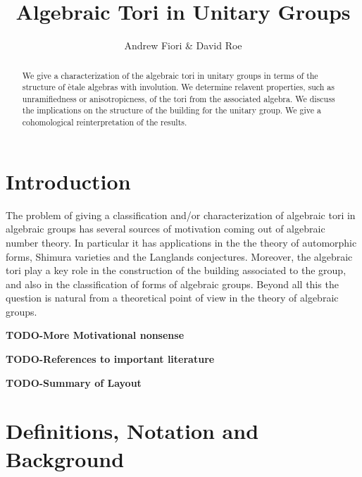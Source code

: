 \documentclass{article}
\title{Algebraic Tori in Unitary Groups}
\author{Andrew Fiori \& David Roe}
\theoremstyle{plain}
\theoremstyle{definition}
\newcommand{\TODO}[1]{\textbf{TODO-#1}}
\begin{document}
\maketitle

\begin{abstract}
We give a characterization of the algebraic tori in unitary groups in terms of the structure of \`etale algebras with involution. We determine relavent properties, such as unramifiedness or anisotropicness, of the tori from the associated algebra. We discuss the implications on the structure of the building for the unitary group. We give a cohomological reinterpretation of the results.
\end{abstract}

\tableofcontents

\section{Introduction}

The problem of giving a classification and/or characterization of algebraic tori in algebraic groups has several sources of motivation coming out of algebraic number theory. In particular it has applications in the the theory of automorphic forms, Shimura varieties and the Langlands conjectures. Moreover, the algebraic tori play a key role in the construction of the building associated to the group, and also in the classification of forms of algebraic groups. Beyond all this the question is natural from a theoretical point of view in the theory of algebraic groups.  

\TODO{More Motivational nonsense}

\TODO{References to important literature}

\TODO{Summary of Layout}

\section{Definitions, Notation and Background}
\end{document}
